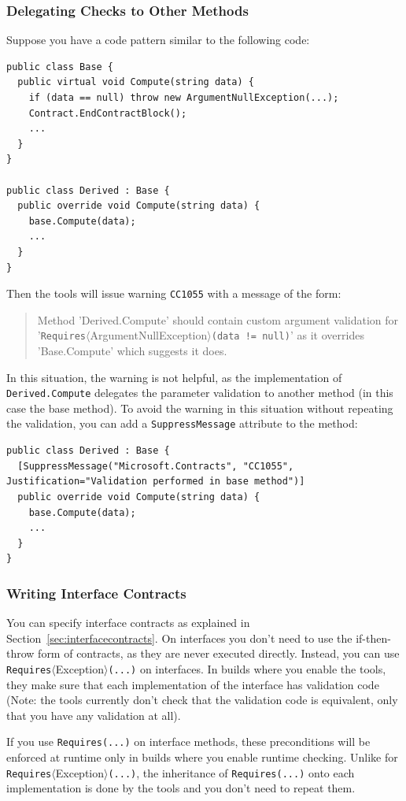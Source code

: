 \documentclass{article}
\newcommand{\code}[1]{\lstinline{#1}}
\newcommand{\requires}[1]{\code{Requires}$\langle$#1$\rangle$}
\begin{document}
\subsubsection{Delegating Checks to Other Methods}
Suppose you have a code pattern similar to the following code:
\begin{lstlisting}
public class Base {
  public virtual void Compute(string data) {
    if (data == null) throw new ArgumentNullException(...);
    Contract.EndContractBlock();
    ...
  }
}

public class Derived : Base {
  public override void Compute(string data) {
    base.Compute(data);
    ...
  }
}
\end{lstlisting}
Then the tools will issue warning \code{CC1055} with a message of the form:
\begin{quote}
Method 'Derived.Compute' should contain custom argument validation for \\
'\requires{ArgumentNullException}\code{(data != null)}' as it overrides
'Base.Compute' which suggests it does.
\end{quote}
In this situation, the warning is not helpful, as the implementation
of \code{Derived.Compute} delegates the parameter validation to
another method (in this case the base method). To avoid the warning in
this situation without repeating the validation, you can add a
\code{SuppressMessage} attribute to the method:
\begin{lstlisting}
public class Derived : Base {
  [SuppressMessage("Microsoft.Contracts", "CC1055", Justification="Validation performed in base method")]
  public override void Compute(string data) {
    base.Compute(data);
    ...
  }
}
\end{lstlisting}


\subsubsection{Writing Interface Contracts}
You can specify interface contracts as explained in
Section~\ref{sec:interfacecontracts}. On interfaces you don't need to
use the if-then-throw form of contracts, as they are never executed
directly. Instead, you can use
\requires{Exception}\code{(...)} on interfaces. In builds where you
enable the tools, they make sure
that each implementation of the interface has validation code (Note:
the tools currently don't check that the validation code is equivalent, only
that you have any validation at all).

If you use \code{Requires(...)} on interface methods, these
preconditions will be enforced at runtime only in builds where you
enable runtime checking. Unlike for \requires{Exception}\code{(...)},
the inheritance of \code{Requires(...)} onto each implementation is
done by the tools and you don't need to repeat them.
\end{document}
